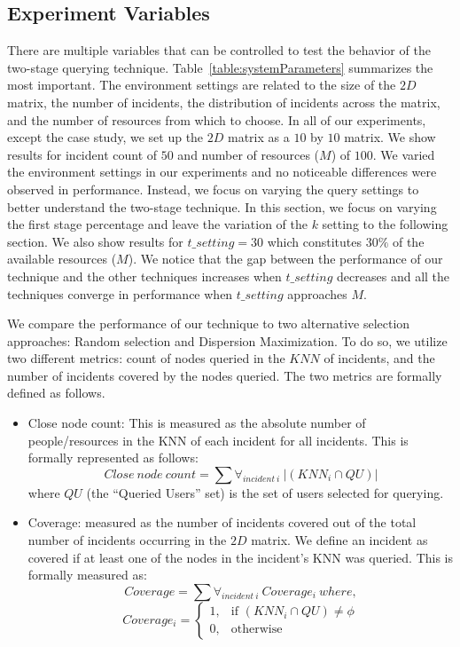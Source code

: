 \documentclass{acm_proc_article-sp}
\begin{document}
\subsection{Experiment Variables}
There are multiple variables that can be controlled to test the behavior of the two-stage querying technique. Table~\ref{table:systemParameters} summarizes the most important.
The environment settings are related to the size of the $2D$ matrix, the number of incidents, the distribution of incidents across the matrix, and the number of resources from which to choose. In all of our experiments, except the case study, we set up the $2D$ matrix as a $10$ by $10$ matrix. We show results for incident count of $50$ and number of resources ($M$) of $100$. We varied the environment settings in our experiments and no noticeable differences were observed in performance. Instead, we focus on varying the query settings to better understand the two-stage technique. In this section, we focus on varying the first stage percentage and leave the variation of the $k$ setting to the following section. We also show results for $t\_setting = 30$ which constitutes $30\%$ of the available resources ($M$). We notice that the gap between the performance of our technique and the other techniques increases when $t\_setting$ decreases and all the techniques converge in performance when $t\_setting$ approaches $M$. \par
We compare the performance of our technique to two alternative selection approaches: Random selection and Dispersion Maximization. To do so, we utilize two different metrics: count of nodes queried in the $KNN$ of incidents, and the number of incidents covered by the nodes queried. The two metrics are formally defined as follows.
\begin{itemize}
\item Close node count: This is measured as the absolute number of people/resources in the KNN of each incident for all incidents. This is formally represented as follows:
\begin{equation}
Close\ node\ count = \sum \forall_{incident\ i}\ |(KNN_i \cap {QU})|
\end{equation}
where $QU$ (the ``Queried Users'' set) is the set of users selected for querying.
\item Coverage: measured as the number of incidents covered out of the total number of incidents occurring in the $2D$ matrix. We define an incident as covered if at least one of the nodes in the incident's KNN was queried. This is formally measured as:
\begin{equation}
Coverage = \sum \forall_{incident\ i}\ Coverage_i\  where,
\end{equation}
\[
 Coverage_i =
\begin{cases}
 1,& \text{if }(KNN_i \cap {QU}) \neq \phi\\
 0,              & \text{otherwise}
\end{cases}
\]
\end{itemize}
\end{document}

